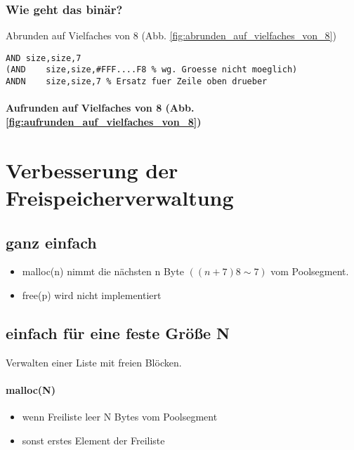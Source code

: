 \subsubsection{Wie geht das binär?}
Abrunden auf Vielfaches von 8 (Abb. \ref{fig:abrunden_auf_vielfaches_von_8})
\begin{lstlisting}
AND	size,size,7
(AND	size,size,#FFF....F8 % wg. Groesse nicht moeglich)
ANDN	size,size,7 % Ersatz fuer Zeile oben drueber
\end{lstlisting}


\paragraph{Aufrunden auf Vielfaches von 8 (Abb. \ref{fig:aufrunden_auf_vielfaches_von_8})}


\section{Verbesserung der Freispeicherverwaltung}

\subsection{ganz einfach}
\begin{itemize}
\item malloc(n) nimmt die nächsten n Byte $((n+7)8 \sim 7)$ vom Poolsegment.
\item free(p) wird nicht implementiert 
\end{itemize}

\subsection{einfach für eine feste Größe N} Verwalten einer Liste mit freien Blöcken.

\paragraph{malloc(N)}
\begin{itemize}
\item wenn Freiliste leer N Bytes vom Poolsegment
\item sonst erstes Element der Freiliste
\end{itemize}

